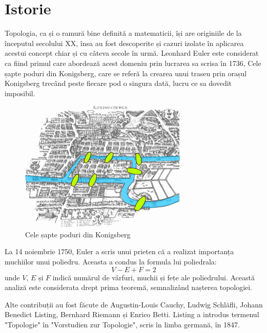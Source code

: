 \newpage
\section{Istorie}
Topologia, ca și o ramură bine definită a matematicii, își are originiile de la începutul secolului XX, 
însa au fost descoperite și cazuri izolate în aplicarea acestui concept chiar și cu câteva secole în urmă. 
Leonhard Euler este considerat ca fiind primul care abordează acest domeniu prin lucrarea sa scrisa în 1736, 
Cele șapte poduri din Konigsberg, care se referă la crearea unui traseu prin orașul Konigsberg trecând peste fiecare pod o 
singura dată, lucru ce sa dovedit imposibil.\newline

\begin{figure}[H]
    \begin{center}
        \includegraphics[scale=0.60]{imagini/istorie/bridge.png}        
    \end{center}
    \caption{Cele șapte poduri din Konigsberg}
    \label{fig:tabs}
\end{figure}


La 14 noiembrie 1750, Euler a scris unui prieten că a realizat importanța muchiilor unui poliedru. 
Aceasta a condus la formula lui poliedrala: \[V-E+F=2\] unde \(V\), \(E\) și \(F\) indică numărul de vârfuri, 
muchii și fețe ale poliedrului. Această analiză este considerata drept prima teoremă, semnalizând nașterea 
topologiei.\newline

Alte contribuții au fost făcute de Augustin-Louis Cauchy, Ludwig Schläfli, Johann Benedict Listing, 
Bernhard Riemann și Enrico Betti. Listing a introdus termenul "Topologie" în "Vorstudien zur Topologie", 
scris în limba germană, în 1847.\newline 
